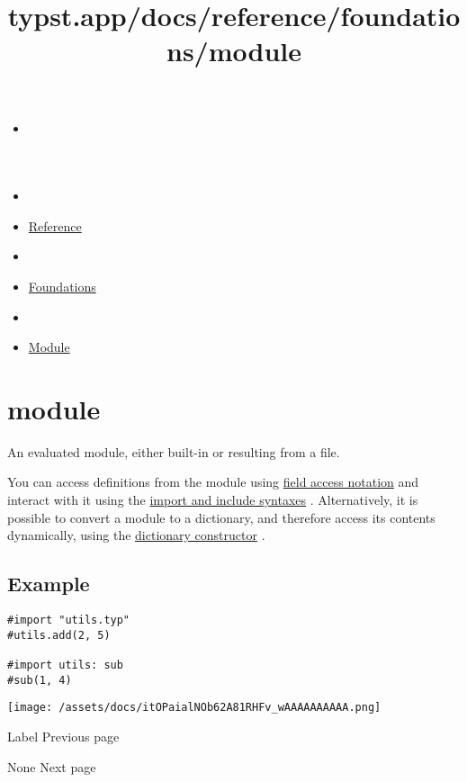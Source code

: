 \title{typst.app/docs/reference/foundations/module}

\begin{itemize}
\tightlist
\item
  \href{/docs}{}
\item
  
\item
  \href{/docs/reference/}{Reference}
\item
  
\item
  \href{/docs/reference/foundations/}{Foundations}
\item
  
\item
  \href{/docs/reference/foundations/module/}{Module}
\end{itemize}

\section{\texorpdfstring{{ module }}{ module }}\label{summary}

An evaluated module, either built-in or resulting from a file.

You can access definitions from the module using
\href{/docs/reference/scripting/\#fields}{field access notation} and
interact with it using the
\href{/docs/reference/scripting/\#modules}{import and include syntaxes}
. Alternatively, it is possible to convert a module to a dictionary, and
therefore access its contents dynamically, using the
\href{/docs/reference/foundations/dictionary/\#constructor}{dictionary
constructor} .

\subsection{Example}\label{example}

\begin{verbatim}
#import "utils.typ"
#utils.add(2, 5)

#import utils: sub
#sub(1, 4)
\end{verbatim}

\texttt{[image: /assets/docs/itOPaialNOb62A81RHFv\_wAAAAAAAAAA.png]}

\href{/docs/reference/foundations/label/}{\pandocbounded{}}

{ Label } { Previous page }

\href{/docs/reference/foundations/none/}{\pandocbounded{}}

{ None } { Next page }
